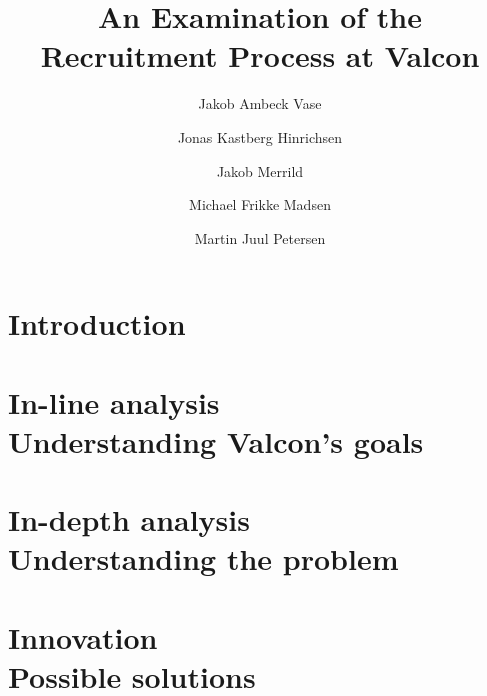 \documentclass[hidelinks, a4paper]{report}
\begin{document}
\title{An Examination of the Recruitment Process at Valcon}
\author{Jakob Ambeck Vase \and Jonas Kastberg Hinrichsen \and Jakob Merrild \and Michael Frikke Madsen \and Martin Juul Petersen}
\listoftodos[Todos]

\maketitle
\tableofcontents
\chapter{Introduction}

\chapter{In-line analysis \\ Understanding Valcon's goals}

\chapter{In-depth analysis \\ Understanding the problem}

\chapter{Innovation \\ Possible solutions}


\appendix


\end{document}
